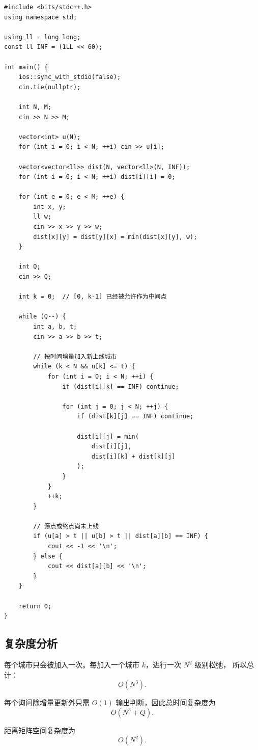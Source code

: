\documentclass[12pt,a4paper]{ctexart}
\begin{document}
\begin{lstlisting}
#include <bits/stdc++.h>
using namespace std;

using ll = long long;
const ll INF = (1LL << 60);

int main() {
    ios::sync_with_stdio(false);
    cin.tie(nullptr);

    int N, M;
    cin >> N >> M;

    vector<int> u(N);
    for (int i = 0; i < N; ++i) cin >> u[i];

    vector<vector<ll>> dist(N, vector<ll>(N, INF));
    for (int i = 0; i < N; ++i) dist[i][i] = 0;

    for (int e = 0; e < M; ++e) {
        int x, y;
        ll w;
        cin >> x >> y >> w;
        dist[x][y] = dist[y][x] = min(dist[x][y], w);
    }

    int Q;
    cin >> Q;

    int k = 0;  // [0, k-1] 已经被允许作为中间点

    while (Q--) {
        int a, b, t;
        cin >> a >> b >> t;

        // 按时间增量加入新上线城市
        while (k < N && u[k] <= t) {
            for (int i = 0; i < N; ++i) {
                if (dist[i][k] == INF) continue;

                for (int j = 0; j < N; ++j) {
                    if (dist[k][j] == INF) continue;

                    dist[i][j] = min(
                        dist[i][j],
                        dist[i][k] + dist[k][j]
                    );
                }
            }
            ++k;
        }

        // 源点或终点尚未上线
        if (u[a] > t || u[b] > t || dist[a][b] == INF) {
            cout << -1 << '\n';
        } else {
            cout << dist[a][b] << '\n';
        }
    }

    return 0;
}
\end{lstlisting}

\subsection*{复杂度分析}

每个城市只会被加入一次。每加入一个城市 $k$，进行一次 $N^2$ 级别松弛，
所以总计：
\[
\boxed{O(N^3)}.
\]

每个询问除增量更新外只需 $O(1)$ 输出判断，因此总时间复杂度为
\[
\boxed{O(N^3+Q)}.
\]

距离矩阵空间复杂度为
\[
\boxed{O(N^2)}.
\]
\end{document}
